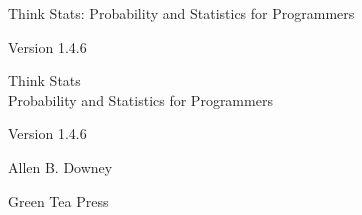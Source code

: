 \documentclass[12pt]{book}
\newcommand{\theversion}{1.4.6}
\begin{document}


\begin{latexonly}

\renewcommand{\blankpage}{\thispagestyle{empty} \quad \newpage}



\thispagestyle{empty}

\begin{flushright}
\vspace*{2.0in}

\begin{spacing}{3}
{\huge Think Stats: Probability and Statistics for Programmers}\\
{\Large }
\end{spacing}

\vspace{0.25in}

Version \theversion

\vfill

\end{flushright}


\blankpage
\blankpage

\pagebreak
\thispagestyle{empty}

\begin{flushright}
\vspace*{2.0in}

\begin{spacing}{3}
{\huge Think Stats}\\
{\Large Probability and Statistics for Programmers}
\end{spacing}

\vspace{0.25in}

Version \theversion

\vspace{1in}


{\Large
Allen B. Downey\\
}


\vspace{0.5in}

{\Large Green Tea Press}


\end{flushright}
\end{latexonly}
\end{document}
